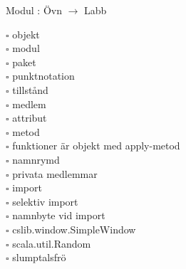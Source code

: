 
    Modul : Övn  $\rightarrow$ Labb 
    \begin{multicols}{3}\SlideFontTiny
    $\square$ objekt \\
$\square$ modul \\
$\square$ paket \\
$\square$ punktnotation \\
$\square$ tillstånd \\
$\square$ medlem \\
$\square$ attribut \\
$\square$ metod \\
$\square$ funktioner är objekt med apply-metod \\
$\square$ namnrymd \\
$\square$ privata medlemmar \\
$\square$ import \\
$\square$ selektiv import \\
$\square$ namnbyte vid import \\
$\square$ cslib.window.SimpleWindow \\
$\square$ scala.util.Random \\
$\square$ slumptalsfrö \\
    \end{multicols}
    